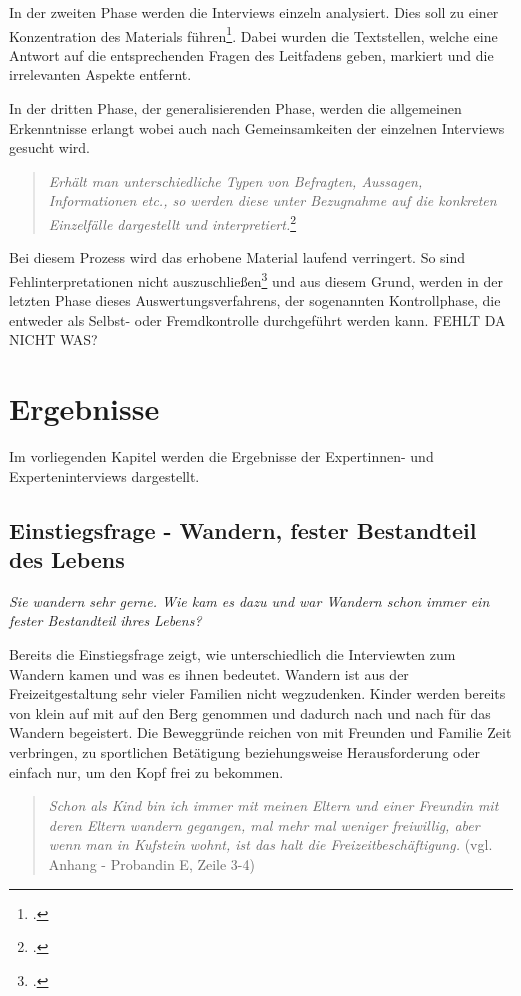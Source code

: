 In der zweiten Phase werden die Interviews einzeln analysiert. Dies soll zu einer Konzentration des Materials führen\footcite[S.368]{lamnek}. Dabei wurden die Textstellen, welche eine Antwort auf die entsprechenden Fragen des Leitfadens geben, markiert und die irrelevanten Aspekte entfernt.

In der dritten Phase, der generalisierenden Phase, werden die allgemeinen Erkenntnisse erlangt wobei auch nach Gemeinsamkeiten der einzelnen Interviews gesucht wird. 

\begin{quote}
	\textit{\glqq Erhält man unterschiedliche Typen von Befragten, Aussagen, Informationen etc., so werden diese unter Bezugnahme auf die konkreten Einzelfälle dargestellt und interpretiert.\grqq}\footcite[S. 369]{lamnek}
\end{quote}

Bei diesem Prozess wird das erhobene Material laufend verringert. So sind Fehlinterpretationen nicht auszuschließen\footcite[S. 369]{lamnek} und aus diesem Grund, werden in der letzten Phase dieses Auswertungsverfahrens, der sogenannten Kontrollphase, die entweder als Selbst- oder Fremdkontrolle durchgeführt werden kann. FEHLT DA NICHT WAS?


\section{Ergebnisse}

Im vorliegenden Kapitel werden die Ergebnisse der Expertinnen- und Experteninterviews dargestellt. 

\subsection{Einstiegsfrage - Wandern, fester Bestandteil des Lebens}

\textit{Sie wandern sehr gerne. Wie kam es dazu und war Wandern schon immer ein fester Bestandteil ihres Lebens?}

Bereits die Einstiegsfrage zeigt, wie unterschiedlich die Interviewten zum Wandern kamen und was es ihnen bedeutet.
Wandern ist aus der Freizeitgestaltung sehr vieler Familien nicht wegzudenken. Kinder werden bereits von klein auf mit auf den Berg genommen und dadurch nach und nach für das Wandern begeistert. Die Beweggründe reichen von mit Freunden und Familie Zeit verbringen, zu sportlichen Betätigung beziehungsweise Herausforderung oder einfach nur, um den Kopf frei zu bekommen. 
\begin{quote}
	\textit{\glqq Schon als Kind bin ich immer mit meinen Eltern und einer Freundin mit deren Eltern wandern gegangen, mal mehr mal weniger freiwillig, aber wenn man in Kufstein wohnt, ist das halt die Freizeitbeschäftigung.\grqq} (vgl. Anhang - Probandin E, Zeile 3-4)
\end{quote}

